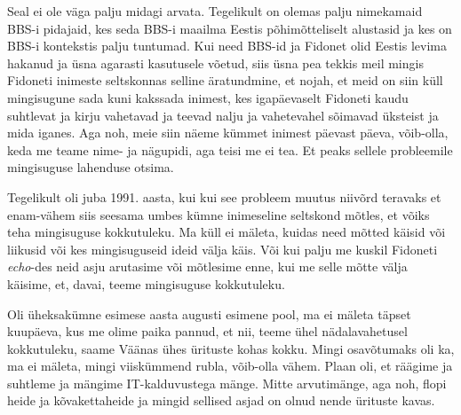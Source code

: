 
Seal ei ole väga palju midagi arvata. Tegelikult on olemas palju nimekamaid BBS-i pidajaid, kes seda  BBS-i maailma Eestis põhimõtteliselt  alustasid ja kes on BBS-i kontekstis palju tuntumad. Kui need BBS-id ja Fidonet  olid Eestis levima hakanud ja üsna agarasti kasutusele võetud, siis üsna pea tekkis meil mingis Fidoneti inimeste seltskonnas  selline äratundmine, et nojah, et meid on siin küll mingisugune sada kuni kakssada inimest, kes igapäevaselt   Fidoneti kaudu suhtlevat ja kirju vahetavad ja teevad nalju ja vahetevahel sõimavad üksteist ja mida iganes. Aga noh, meie siin  näeme kümmet inimest päevast päeva, võib-olla, keda me teame nime- ja nägupidi, aga teisi me ei tea. Et peaks sellele probleemile mingisuguse lahenduse otsima. 

Tegelikult oli juba 1991. aasta, kui kui see probleem muutus niivõrd teravaks et enam-vähem siis seesama  umbes kümne inimeseline seltskond mõtles, et võiks teha mingisuguse kokkutuleku. Ma küll ei mäleta, kuidas need mõtted käisid või liikusid või kes mingisuguseid ideid välja käis. Või kui palju me kuskil Fidoneti \emph{echo}-des neid asju arutasime või mõtlesime enne, kui me selle mõtte välja käisime, et, davai, teeme mingisuguse kokkutuleku.

Oli üheksakümne esimese aasta augusti esimene pool, ma ei mäleta täpset kuupäeva, kus me olime  paika pannud, et nii, teeme  ühel nädalavahetusel kokkutuleku, saame Väänas ühes ürituste kohas kokku. Mingi osavõtumaks oli ka,  ma ei mäleta, mingi viiskümmend rubla,  võib-olla vähem. Plaan oli, et räägime  ja suhtleme ja mängime   IT-kalduvustega mänge. Mitte arvutimänge, aga noh, flopi heide ja kõvakettaheide ja mingid sellised asjad on olnud nende ürituste kavas. 


